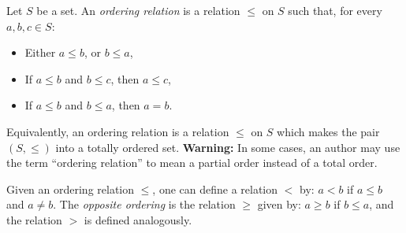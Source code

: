 \documentclass{article}
\begin{document}
Let $S$ be a set. An {\em ordering relation} is a relation $\leq$ on $S$ such that, for every $a,b,c \in S$:
\begin{itemize}
\item Either $a \leq b$, or $b \leq a$,
\item If $a \leq b$ and $b \leq c$, then $a \leq c$,
\item If $a \leq b$ and $b \leq a$, then $a = b$.
\end{itemize}

Equivalently, an ordering relation is a relation $\leq$ on $S$ which makes the pair $(S,\leq)$ into a totally ordered set. {\bf Warning:} In some cases, an author may use the term ``ordering relation'' to mean a partial order instead of a total order.

Given an ordering relation $\leq$, one can define a relation $<$ by: $a < b$ if $a \leq b$ and $a \neq b$. The {\em opposite ordering} is the relation $\geq$ given by: $a \geq b$ if $b \leq a$, and the relation $>$ is defined analogously.
\end{document}
